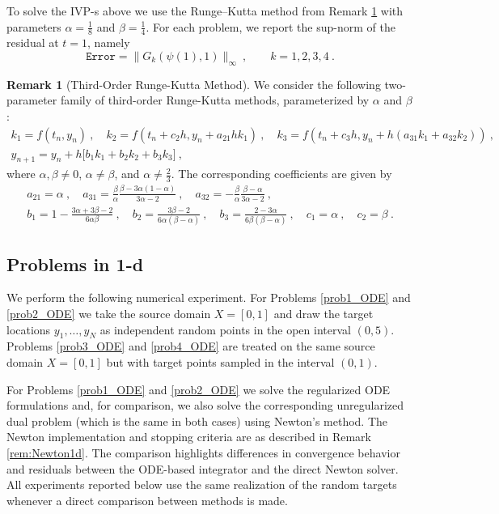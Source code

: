 \documentclass{scrartcl}
\theoremstyle{plain}
\theoremstyle{definition}
\newtheorem{rem}[thm]{Remark}
\begin{document}
To solve the IVP-s above we use the Runge--Kutta method from Remark \ref{rem:RK} with parameters \(\alpha=\tfrac{1}{8}\) and \(\beta=\tfrac{1}{4}\). For each problem, we report the sup-norm of the residual at \(t=1\), namely
\[
\texttt{Error} = \|G_k(\psi(1),1)\|_{\infty}\ , \qquad k=1,2,3,4\ .
\]

\begin{rem}[Third-Order Runge-Kutta Method]\label{rem:RK}
   We consider the following two-parameter family of third-order Runge-Kutta methods, parameterized by \(\alpha\) and \(\beta\):
    \begin{gather*}
        k_1 = f(t_n, y_n)\ , \quad
        k_2 = f(t_n + c_2 h, y_n + a_{21} h k_1)\ , \quad
        k_3 = f\!\left(t_n + c_3 h, y_n + h(a_{31} k_1 + a_{32} k_2)\right)\ ,\\
        y_{n+1} = y_n + h \bigl[b_1 k_1 + b_2 k_2 + b_3 k_3\bigr]\ ,
    \end{gather*}
    where \(\alpha,\beta \neq 0\), \(\alpha \neq \beta\), and \(\alpha \neq \tfrac{2}{3}\). The corresponding coefficients are given by
    \begin{gather*}
        a_{21} = \alpha\ , \quad
        a_{31} = \frac{\beta}{\alpha}\frac{\beta - 3\alpha(1-\alpha)}{3\alpha-2}\ , \quad
        a_{32} = -\frac{\beta}{\alpha}\frac{\beta - \alpha}{3\alpha-2}\ ,\\
        b_1 = 1 - \frac{3\alpha + 3\beta - 2}{6\alpha\beta}\ , \quad
        b_2 = \frac{3\beta - 2}{6\alpha(\beta - \alpha)}\ , \quad
        b_3 = \frac{2 - 3\alpha}{6\beta(\beta - \alpha)}\ , \quad
        c_1 = \alpha\ , \quad
        c_2 = \beta\ .
    \end{gather*}
\end{rem}

\subsection{Problems in 1-d}

We perform the following numerical experiment.  For Problems \eqref{prob1_ODE} and \eqref{prob2_ODE} we take the source domain \(X=[0,1]\) and draw the target locations \(y_1,\dots,y_N\) as independent random points in the open interval \((0,5)\).  Problems \eqref{prob3_ODE} and \eqref{prob4_ODE} are treated on the same source domain \(X=[0,1]\) but with target points sampled in the interval \((0,1)\).

For Problems \eqref{prob1_ODE} and \eqref{prob2_ODE} we solve the regularized ODE formulations and, for comparison, we also solve the corresponding unregularized dual problem (which is the same in both cases) using Newton's method.  The Newton implementation and stopping criteria are as described in Remark \ref{rem:Newton1d}.  The comparison highlights differences in convergence behavior and residuals between the ODE-based integrator and the direct Newton solver. All experiments reported below use the same realization of the random targets whenever a direct comparison between methods is made.
\end{document}
